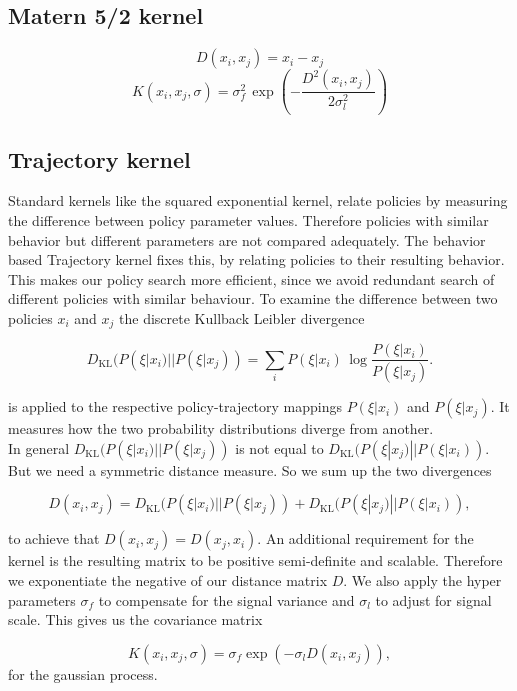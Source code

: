 \subsection{Matern 5/2 kernel}
$$D(x_i,x_j) = x_i-x_j$$
$$K(x_i,x_j,\sigma) = \sigma_{f}^{2}\,\exp\left(-\frac{D^2(x_i,x_j)}{2\sigma_l^2} \right) $$
\subsection{Trajectory kernel}
Standard kernels like the squared exponential kernel, relate policies by measuring the difference between policy parameter values. Therefore policies with similar behavior but different parameters are not compared adequately. The behavior based Trajectory kernel fixes this, by relating policies to their resulting behavior. This makes our policy search more efficient, since we avoid redundant search of different policies with similar behaviour. To examine the difference between two policies $x_{ i }$ and $x_{ j }$ the discrete Kullback Leibler divergence

$$D_{\mathrm {KL} }(P(\xi|x_{ i })||P(\xi|x_{ j })) = \sum _{i}P(\xi|x_{ i })\,\log {\frac {P(\xi|x_{ i })}{P(\xi|x_{ j })}}.$$

is applied to the respective policy-trajectory mappings $P(\xi|x_{ i })$ and $P(\xi|x_{ j })$. It measures how the two probability distributions diverge from another.\\

In general $D_{\mathrm {KL} }(P(\xi|x_{ i })||P(\xi|x_{ j }))$ is not equal to $D_{\mathrm {KL} }(P(\xi|x_{ j })||P(\xi|x_{ i }))$. But we need a symmetric distance measure. So we sum up the two divergences

$$D(x_{ i }, x_{ j }) = D_{\mathrm {KL} }(P(\xi|x_{ i })||P(\xi|x_{ j })) + D_{\mathrm {KL} }(P(\xi|x_{ j })||P(\xi|x_{ i })),$$

to achieve that $D(x_{ i }, x_{ j }) = D(x_{ j }, x_{ i })$. An additional requirement for the kernel is the resulting matrix to be positive semi-definite and scalable\cite{wilson2014using}. Therefore we exponentiate the negative of our distance matrix $D$. We also apply the hyper parameters $\sigma_f$ to compensate for the signal variance and $\sigma_l$ to adjust for signal scale. This gives us the covariance matrix

\begin{equation} \label{eq:trajKernel}
K(x_{ i },x_{ j },\sigma) = \sigma_f \exp(-\sigma_l D(x_{ i }, x_{ j })),
\end{equation}
for the gaussian process.

